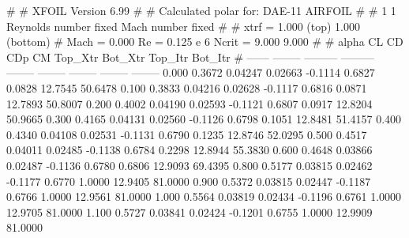 #  
#       XFOIL         Version 6.99
#  
# Calculated polar for: DAE-11 AIRFOIL                                  
#  
# 1 1 Reynolds number fixed          Mach number fixed         
#  
# xtrf =   1.000 (top)        1.000 (bottom)  
# Mach =   0.000     Re =     0.125 e 6     Ncrit =   9.000  9.000
#  
#   alpha    CL        CD       CDp       CM     Top_Xtr  Bot_Xtr  Top_Itr  Bot_Itr
#  ------ -------- --------- --------- -------- -------- -------- -------- --------
   0.000   0.3672   0.04247   0.02663  -0.1114   0.6827   0.0828  12.7545  50.6478
   0.100   0.3833   0.04216   0.02628  -0.1117   0.6816   0.0871  12.7893  50.8007
   0.200   0.4002   0.04190   0.02593  -0.1121   0.6807   0.0917  12.8204  50.9665
   0.300   0.4165   0.04131   0.02560  -0.1126   0.6798   0.1051  12.8481  51.4157
   0.400   0.4340   0.04108   0.02531  -0.1131   0.6790   0.1235  12.8746  52.0295
   0.500   0.4517   0.04011   0.02485  -0.1138   0.6784   0.2298  12.8944  55.3830
   0.600   0.4648   0.03866   0.02487  -0.1136   0.6780   0.6806  12.9093  69.4395
   0.800   0.5177   0.03815   0.02462  -0.1177   0.6770   1.0000  12.9405  81.0000
   0.900   0.5372   0.03815   0.02447  -0.1187   0.6766   1.0000  12.9561  81.0000
   1.000   0.5564   0.03819   0.02434  -0.1196   0.6761   1.0000  12.9705  81.0000
   1.100   0.5727   0.03841   0.02424  -0.1201   0.6755   1.0000  12.9909  81.0000
